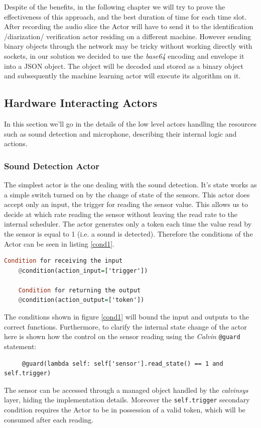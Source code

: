 Despite of the benefits, in the following chapter we will try to prove the effectiveness of this approach,
and the best duration of time for each time slot.\newline
After recording the audio slice the Actor will have to send it to the identification /diarization/ verification
actor residing on a different machine. However sending binary objects through the network
may be tricky without working directly with sockets, in our solution we decided to
use the \textit{base64} encoding and envelope it into a JSON object. The object will be decoded
and stored as a binary object and subsequently the machine learning actor will execute
its algorithm on it.

\subsection{Hardware Interacting Actors}

In this section we'll go in the details of the low level actors handling the resources
such as sound detection and microphone, describing their internal logic and actions.

\subsubsection{Sound Detection Actor}

The simplest actor is the one dealing with the sound detection. It's state works
as a simple switch turned on by the change of state of the sensors. This actor does
accept only an input, the trigger for reading the sensor value. This allows us to
decide at which rate reading the sensor without leaving the read rate to the internal
scheduler. The actor generates only a token each time the value read by the
sensor is equal to 1 (i.e. a sound is detected). Therefore the conditions
of the Actor can be seen in listing \ref{cond1}.

\begin{lstlisting}[language=Haskell,frame=single,caption=Sound Actor conditions,label=cond1]
    Condition for receiving the input
    @condition(action_input=['trigger'])

    Condition for returning the output
    @condition(action_output=['token'])

\end{lstlisting}

 The conditions shown in figure \ref{cond1} will bound the input and outputs to the correct functions.
 Furthermore, to clarify the internal state change of the actor here is shown
 how the control on the sensor reading using the \textit{Calvin} \texttt{@guard}
 statement:
 \begin{verbatim}
     @guard(lambda self: self['sensor'].read_state() == 1 and self.trigger)
 \end{verbatim}
 The sensor can be accessed through a managed object handled by the \textit{calvinsys}
 layer, hiding the implementation details. Moreover the \texttt{self.trigger} secondary
 condition requires the Actor to be in possession of a valid token, which will be consumed
 after each reading.

